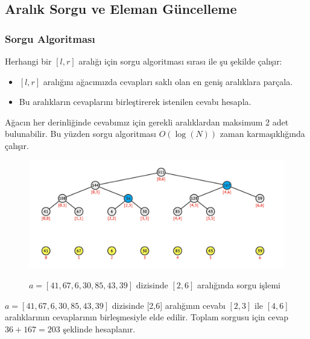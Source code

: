\documentclass[12pt]{article}
\begin{document}
    \subsection{Aral{\i}k Sorgu ve Eleman G\"{u}ncelleme}
    
    \subsubsection{Sorgu Algoritmas{\i}}
    
    Herhangi bir $[l,r]$ aral{\i}\u{g}{\i} i\c{c}in sorgu algoritmas{\i} s{\i}ras{\i} ile \c{s}u \c{s}ekilde \c{c}al{\i}\c{s}{\i}r:
    
    \begin{itemize}
        
        \item $[l,r]$ aral{\i}\u{g}{\i}n{\i} a\u{g}ac{\i}m{\i}zda cevaplar{\i} sakl{\i} olan en geni\c{s} aral{\i}klara  par\c{c}ala.
        
        \item Bu aral{\i}klar{\i}n cevaplar{\i}n{\i} birle\c{s}tirerek istenilen cevab{\i} hesapla.
    
    \end{itemize}

    A\u{g}ac{\i}n her derinli\u{g}inde cevab{\i}m{\i}z i\c{c}in gerekli aral{\i}klardan maksimum 2
    adet bulunabilir. Bu y\"{u}zden sorgu algoritmas{\i} $O(\log(N))$ zaman karma\c{s}{\i}kl{\i}\u{g}{\i}nda \c{c}al{\i}\c{s}{\i}r.

    
    \clearpage
    
	\begin{figure}[h]
		\centering
		\includegraphics[width=\linewidth/1]{segtreequery.png}
		\label{fig:segtreequery}
        \caption{$a = [41,67,6,30,85,43,39]$ dizisinde $[2,6]$ aral{\i}\u{g}{\i}nda sorgu i\c{s}lemi}
	\end{figure}

    $a = [41,67,6,30,85,43,39]$ dizisinde [2,6] aral{\i}\u{g}{\i}n{\i}n cevab{\i} $[2,3]$ ile $[4,6]$ aral{\i}klar{\i}n{\i}n cevaplar{\i}n{\i}n birle\c{s}mesiyle elde edilir. Toplam sorgusu i\c{c}in cevap $36+167=203$ \c{s}eklinde hesaplan{\i}r.
    
\end{document}
